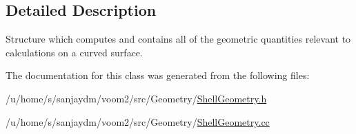 \subsection{Detailed Description}
Structure which computes and contains all of the geometric quantities relevant to calculations on a curved surface. 

The documentation for this class was generated from the following files:\begin{DoxyCompactItemize}
\item 
/u/home/s/sanjaydm/voom2/src/Geometry/\hyperlink{_shell_geometry_8h}{ShellGeometry.h}\item 
/u/home/s/sanjaydm/voom2/src/Geometry/\hyperlink{_shell_geometry_8cc}{ShellGeometry.cc}\end{DoxyCompactItemize}
